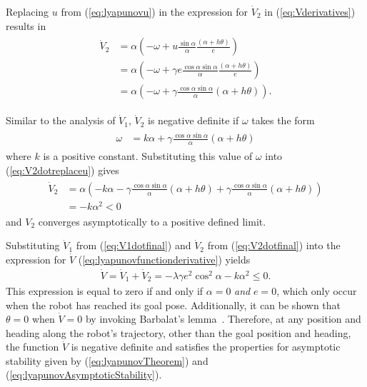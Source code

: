Replacing $u$ from (\ref{eq:lyapunovu}) in the expression for $\dot{V}_2$ in (\ref{eq:Vderivatives}) results in
\begin{align}
\label{eq:V2dotreplaceu}
\begin{split}
\dot{V}_2 &= \alpha\left(-\omega+u\frac{\sin\alpha}{\alpha}\frac{(\alpha+h\theta)}{e}\right) \\
&= \alpha\left(-\omega+\gamma e\frac{\cos\alpha\sin\alpha}{\alpha}\frac{(\alpha+h\theta)}{e}\right) \\
&= \alpha\left(-\omega+\gamma\frac{\cos\alpha\sin\alpha}{\alpha}(\alpha+h\theta)\right).
\end{split}
\end{align}

Similar to the analysis of $\dot{V}_1$, $\dot{V}_2$ is negative definite if $\omega$ takes the form
\begin{align}
\label{eq:lyapunovomega}
\begin{split}
\omega &= k\alpha + \gamma\frac{\cos\alpha\sin\alpha}{\alpha}\left(\alpha+h\theta\right)
\end{split}
\end{align}
where $k$ is a positive constant. Substituting this value of $\omega$ into (\ref{eq:V2dotreplaceu}) gives
\begin{align}
\label{eq:V2dotfinal}
\begin{split}
\dot{V}_2 &= \alpha\left(-k\alpha-\gamma\frac{\cos\alpha\sin\alpha}{\alpha}(\alpha+h\theta) + \gamma\frac{\cos\alpha\sin\alpha}{\alpha}(\alpha+h\theta)\right) \\
&= -k\alpha^2 < 0
\end{split}
\end{align}
and $V_2$ converges asymptotically to a positive defined limit.

Substituting $\dot{V}_1$ from (\ref{eq:V1dotfinal}) and $\dot{V}_2$ from (\ref{eq:V2dotfinal}) into the expression for $\dot{V}$ (\ref{eq:lyapunovfunctionderivative}) yields
\begin{align*}
\dot{V} = \dot{V}_1 + \dot{V}_2 = -\lambda\gamma e^2\cos^2\alpha - k\alpha^2 \leq 0.
\end{align*}
This expression is equal to zero if and only if $\alpha=0$ \textit{and} $e=0$, which only occur when the robot has reached its goal pose. Additionally, it can be shown that $\theta=0$ when $\dot{V}=0$ by invoking Barbalat's lemma~\cite{Aicardi_UnicycleLyapunov95}. Therefore, at any position and heading along the robot's trajectory, other than the goal position and heading, the function $\dot{V}$ is negative definite and satisfies the properties for asymptotic stability given by (\ref{eq:lyapunovTheorem}) and (\ref{eq:lyapunovAsymptoticStability}).

